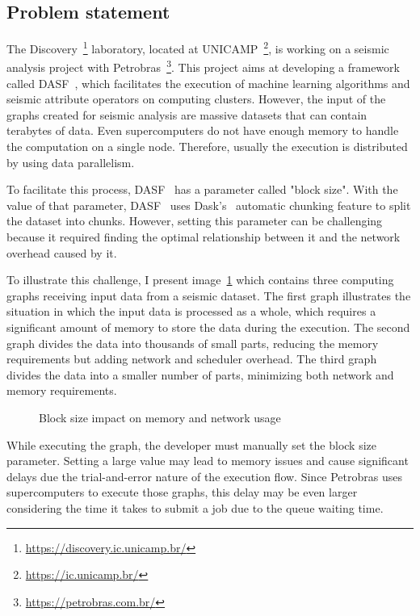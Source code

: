 \subsection{Problem statement}
\label{subsec:problem-statement}

The Discovery~\footnote{\url{https://discovery.ic.unicamp.br/}} laboratory, located at \ac{UNICAMP}~\footnote{\url{https://ic.unicamp.br/}}, is working on a seismic analysis project with Petrobras~\footnote{\url{https://petrobras.com.br/}}.
This project aims at developing a framework called \ac{DASF}~\cite{dasf}, which facilitates the execution of machine learning algorithms and seismic attribute operators on computing clusters.
However, the input of the graphs created for seismic analysis are massive datasets that can contain terabytes of data.
Even supercomputers do not have enough memory to handle the computation on a single node.
Therefore, usually the execution is distributed by using data parallelism.

To facilitate this process, \ac{DASF}~\cite{dasf} has a parameter called "block size".
With the value of that parameter, \ac{DASF}~\cite{dasf} uses Dask's~\cite{dask} automatic chunking feature to split the dataset into chunks.
However, setting this parameter can be challenging because it required finding the optimal relationship between it and the network overhead caused by it.

To illustrate this challenge, I present image~\ref{fig:block-size} which contains three computing graphs receiving input data from a seismic dataset.
The first graph illustrates the situation in which the input data is processed as a whole, which requires a significant amount of memory to store the data during the execution.
The second graph divides the data into thousands of small parts, reducing the memory requirements but adding network and scheduler overhead.
The third graph divides the data into a smaller number of parts, minimizing both network and memory requirements.

\begin{figure}[ht]
  \caption{Block size impact on memory and network usage}
  \label{fig:block-size}
\end{figure}

While executing the graph, the developer must manually set the block size parameter.
Setting a large value may lead to memory issues and cause significant delays due the trial-and-error nature of the execution flow.
Since Petrobras uses supercomputers to execute those graphs, this delay may be even larger considering the time it takes to submit a job due to the queue waiting time.

